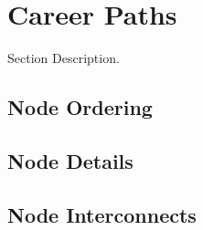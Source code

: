 \section{Career Paths}
\label{sect:career-paths}
Section Description.  

\subsection{Node Ordering}

\subsection{Node Details}

\subsection{Node Interconnects}


